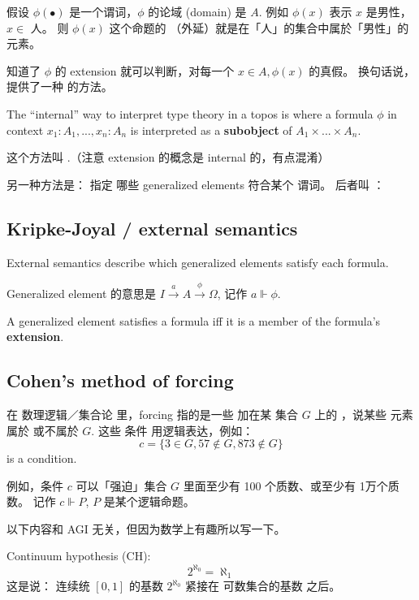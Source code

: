 假设 $\phi(\bullet)$ 是一个谓词，$\phi$ 的论域 (domain) 是 $A$.  例如 $\phi(x)$ 表示 $x$ 是男性，$x \in$ 人。  则 $\phi(x)$ 这个命题的 （外延）就是在「人」的集合中属於「男性」的元素。 

知道了 $\phi$ 的 extension 就可以判断，对每一个 $x \in A, \phi(x)$ 的真假。  换句话说，提供了一种  的方法。 

The ``internal'' way to interpret type theory in a topos is where a formula $\phi$ in context $x_1: A_1, ... , x_n: A_n$ is interpreted as a \textbf{subobject} of $A_1 \times ... \times A_n$.

这个方法叫 .（注意 extension 的概念是 internal 的，有点混淆）

另一种方法是： 指定 哪些 generalized elements 符合某个 谓词。  后者叫 ：

\subsection{Kripke-Joyal / external semantics}

External semantics describe which generalized elements satisfy each formula.

Generalized element 的意思是 $I \stackrel{a}{\rightarrow} A \stackrel{\phi}{\rightarrow} \Omega$, 记作 $a \Vdash \phi$.

A generalized element satisfies a formula iff it is a member of the formula's \textbf{extension}.

\subsection{Cohen's method of forcing}
\label{sec:forcing}

在 数理逻辑／集合论 里，forcing 指的是一些 加在某 集合 $G$ 上的 ，说某些 元素 属於 或不属於 $G$.  这些 条件 用逻辑表达，例如：
\begin{equation}
c = \{ 3 \in G, 57 \notin G, 873 \notin G \}
\end{equation}
is a condition.

例如，条件 $c$ 可以「强迫」集合 $G$ 里面至少有 100 个质数、或至少有 1万个质数。 记作 $c \Vdash P$, $P$ 是某个逻辑命题。

以下内容和 AGI 无关，但因为数学上有趣所以写一下。

Continuum hypothesis (CH):
\begin{equation}
2^{\aleph_0} = \aleph_1
\end{equation}
这是说： 连续统 $[0,1]$ 的基数 $2^{\aleph_0}$ 紧接在 可数集合的基数 之后。

